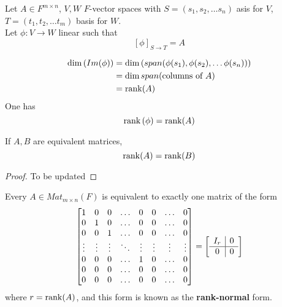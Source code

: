\begin{remark}
    Let $A \in F^{m \times n}$, $V, W$ $F$-vector spaces with $S = (s_1, s_2, \hdots s_n)$ asis for $V$, $T = (t_1, t_2, \hdots t_m)$ basis for $W$. \\

    Let $ \phi: V \to W$ linear such that 
    \[
        \left[ \phi \right]_{S \to T} = A
    \]

    \begin{align*}
        \dim \left( Im( \phi) \right)  &= \dim \left( span(\phi(s_1), \phi(s_2), \hdots \phi(s_n)) \right)  \\
        &= \dim span( \text{columns of } A) \\
        &= \rank(A)
    \end{align*}
    One has 
    \[
        \rank \left( \phi \right)  = \rank(A) 
    \]
\end{remark}

\begin{corollary}
    If $A, B$ are equivalent matrices, 
    \[
        \rank(A) = \rank(B)
    \]
\end{corollary}
\begin{proof} To be updated
\end{proof}

\begin{theorem}     
    Every $A \in Mat_{m \times n}(F)$ is equivalent to exactly one matrix of the form 
\[ 
\begin{bmatrix}
    1 & 0 & 0 & \hdots & 0 & 0 & \hdots & 0 \\
    0 & 1 & 0 & \hdots & 0 & 0 & \hdots & 0 \\
    0 & 0 & 1 & \hdots & 0 & 0 & \hdots & 0 \\
    \vdots & \vdots & \vdots & \ddots & \vdots & \vdots & \vdots & \vdots \\
    0 & 0 & 0 & \hdots & 1 & 0 & \hdots & 0 \\
    0 & 0 & 0 & \hdots & 0 & 0 & \hdots & 0 \\
    0 & 0 & 0 & \hdots & 0 & 0 & \hdots & 0 \\
\end{bmatrix} = \left[
    \begin{array}{c | c}
    I_r & 0 \\
    \hline
    0 & 0
    \end{array}
\right]
\]
where $r = \rank(A)$, and this form is known as the \textbf{rank-normal} form.
\end{theorem}       

